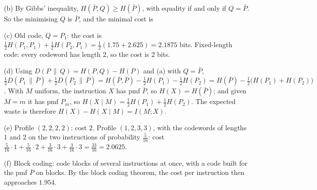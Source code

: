 \begin{enumerate}[resume*=quiz]
\begin{solution}
(b) By Gibbs' inequality, $H(\bar P,Q)\ge H(\bar P)$, with equality if and only if $Q=\bar P$. So the minimising $Q$ is $\bar P$, and the minimal cost is

(c) Old code, $Q=P_1$: the cost is $\tfrac12H(P_1,P_1)+\tfrac12H(P_2,P_1)=\tfrac12(1.75+2.625)=2.1875$ bits. Fixed-length code: every codeword has length $2$, so the cost is $2$ bits.

(d) Using $D(P\,\|\,Q)=H(P,Q)-H(P)$ and (a) with $Q=\bar P$,
$\tfrac12D(P_1\,\|\,\bar P)+\tfrac12D(P_2\,\|\,\bar P)=H(\bar P,\bar P)-\tfrac12H(P_1)-\tfrac12H(P_2)=H(\bar P)-\tfrac12\big(H(P_1)+H(P_2)\big)$.
With $M$ uniform, the instruction $X$ has pmf $\bar P$, so $H(X)=H(\bar P)$; and given $M=m$ it has pmf $P_m$, so $H(X\mid M)=\tfrac12H(P_1)+\tfrac12H(P_2)$. The expected waste is therefore $H(X)-H(X\mid M)=I(M;X)$.

(e) Profile $(2,2,2,2)$: cost $2$. Profile $(1,2,3,3)$, with the codewords of lengths $1$ and $2$ on the two instructions of probability $\tfrac5{16}$: cost $\tfrac5{16}\cdot1+\tfrac5{16}\cdot2+\tfrac3{16}\cdot3+\tfrac3{16}\cdot3=\tfrac{33}{16}=2.0625$.

(f) Block coding: code blocks of several instructions at once, with a code built for the pmf $\bar P$ on blocks. By the block coding theorem, the cost per instruction then approaches $1.954$.
\end{solution}


\end{enumerate}
